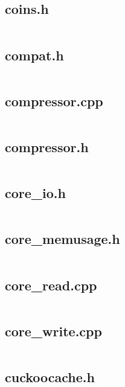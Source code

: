 \documentclass{article}
\begin{document}
\subsection{coins.h}
\inputminted{cpp}{/home/dufferzafar/dev/@clones/bitcoin/src/coins.h}
\newpage

\subsection{compat.h}
\inputminted{cpp}{/home/dufferzafar/dev/@clones/bitcoin/src/compat.h}
\newpage

\subsection{compressor.cpp}
\inputminted{cpp}{/home/dufferzafar/dev/@clones/bitcoin/src/compressor.cpp}
\newpage

\subsection{compressor.h}
\inputminted{cpp}{/home/dufferzafar/dev/@clones/bitcoin/src/compressor.h}
\newpage

\subsection{core\_io.h}
\inputminted{cpp}{/home/dufferzafar/dev/@clones/bitcoin/src/core_io.h}
\newpage

\subsection{core\_memusage.h}
\inputminted{cpp}{/home/dufferzafar/dev/@clones/bitcoin/src/core_memusage.h}
\newpage

\subsection{core\_read.cpp}
\inputminted{cpp}{/home/dufferzafar/dev/@clones/bitcoin/src/core_read.cpp}
\newpage

\subsection{core\_write.cpp}
\inputminted{cpp}{/home/dufferzafar/dev/@clones/bitcoin/src/core_write.cpp}
\newpage

\subsection{cuckoocache.h}
\inputminted{cpp}{/home/dufferzafar/dev/@clones/bitcoin/src/cuckoocache.h}
\newpage
\end{document}
